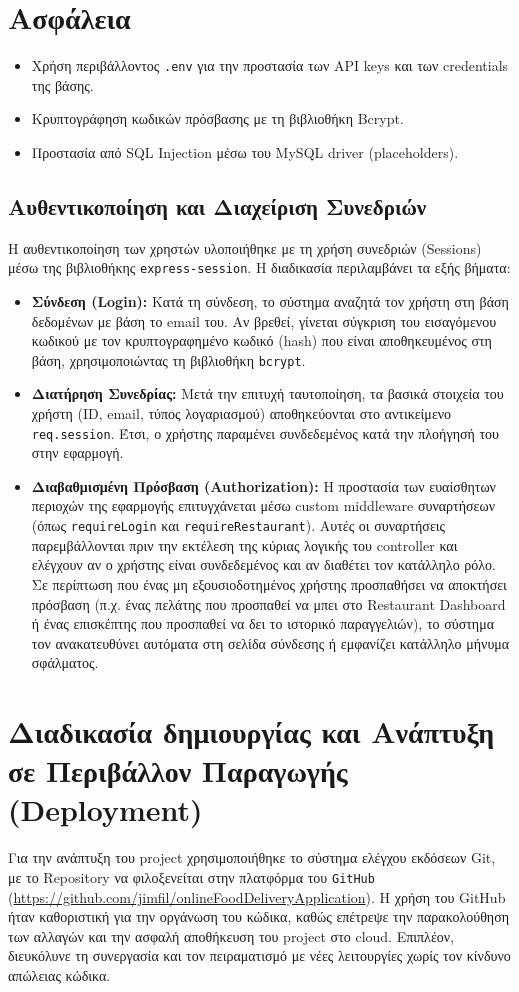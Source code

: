\documentclass[acmsmall,screen,nonacm]{acmart}
\begin{document}
	\section{Ασφάλεια}
	\begin{itemize}
		\item Χρήση περιβάλλοντος \texttt{.env} για την προστασία των API keys και των credentials της βάσης.
		\item Κρυπτογράφηση κωδικών πρόσβασης με τη βιβλιοθήκη Bcrypt.
		\item Προστασία από SQL Injection μέσω του MySQL driver (placeholders).
	\end{itemize}

	\subsection{Αυθεντικοποίηση και Διαχείριση Συνεδριών}
	Η αυθεντικοποίηση των χρηστών υλοποιήθηκε με τη χρήση συνεδριών (Sessions) μέσω της βιβλιοθήκης \texttt{express-session}. Η διαδικασία περιλαμβάνει τα εξής βήματα:
	\begin{itemize}
		\item \textbf{Σύνδεση (Login):} Κατά τη σύνδεση, το σύστημα αναζητά τον χρήστη στη βάση δεδομένων με βάση το email του. Αν βρεθεί, γίνεται σύγκριση του εισαγόμενου κωδικού με τον κρυπτογραφημένο κωδικό (hash) που είναι αποθηκευμένος στη βάση, χρησιμοποιώντας τη βιβλιοθήκη \texttt{bcrypt}.
		\item \textbf{Διατήρηση Συνεδρίας:} Μετά την επιτυχή ταυτοποίηση, τα βασικά στοιχεία του χρήστη (ID, email, τύπος λογαριασμού) αποθηκεύονται στο αντικείμενο \texttt{req.session}. Έτσι, ο χρήστης παραμένει συνδεδεμένος κατά την πλοήγησή του στην εφαρμογή.
		\item \textbf{Διαβαθμισμένη Πρόσβαση (Authorization):} Η προστασία των ευαίσθητων περιοχών της εφαρμογής επιτυγχάνεται μέσω custom middleware συναρτήσεων (όπως \texttt{requireLogin} και \texttt{requireRestaurant}). Αυτές οι συναρτήσεις παρεμβάλλονται πριν την εκτέλεση της κύριας λογικής του controller και ελέγχουν αν ο χρήστης είναι συνδεδεμένος και αν διαθέτει τον κατάλληλο ρόλο. Σε περίπτωση που ένας μη εξουσιοδοτημένος χρήστης προσπαθήσει να αποκτήσει πρόσβαση (π.χ. ένας πελάτης που προσπαθεί να μπει στο Restaurant Dashboard ή ένας επισκέπτης που προσπαθεί να δει το ιστορικό παραγγελιών), το σύστημα τον ανακατευθύνει αυτόματα στη σελίδα σύνδεσης ή εμφανίζει κατάλληλο μήνυμα σφάλματος.
	\end{itemize}

	\section{Διαδικασία δημιουργίας και Ανάπτυξη σε Περιβάλλον Παραγωγής (Deployment)}
	Για την ανάπτυξη του project χρησιμοποιήθηκε το σύστημα ελέγχου εκδόσεων Git, με το Repository να φιλοξενείται στην πλατφόρμα του \texttt{GitHub} (\url{https://github.com/jimfil/onlineFoodDeliveryApplication}). Η χρήση του GitHub ήταν καθοριστική για την οργάνωση του κώδικα, καθώς επέτρεψε την παρακολούθηση των αλλαγών και την ασφαλή αποθήκευση του project στο cloud. Επιπλέον, διευκόλυνε τη συνεργασία και τον πειραματισμό με νέες λειτουργίες χωρίς τον κίνδυνο απώλειας κώδικα.
\end{document}
